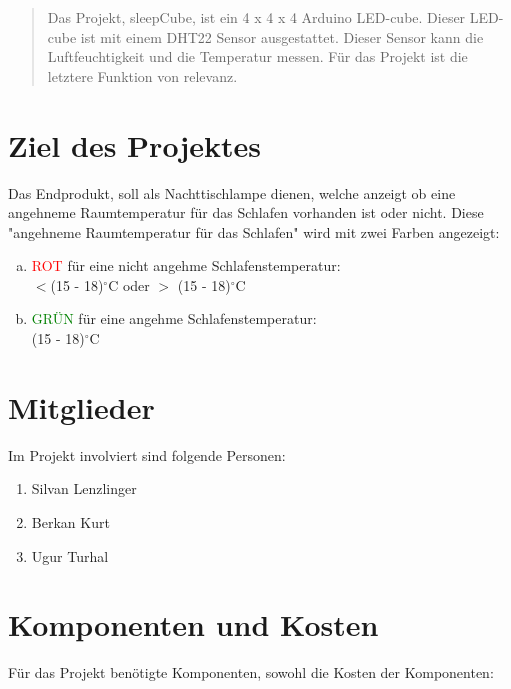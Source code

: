 \documentclass{paper}
\begin{document}
\pagestyle{fancy}
\fancyhead[C]{}                       
\begin{abstract}
\noindent Das Projekt, sleepCube, ist ein 4 x 4 x 4 Arduino LED-cube. Dieser LED-cube ist mit einem DHT22 Sensor ausgestattet. Dieser Sensor kann die Luftfeuchtigkeit und die Temperatur messen. Für das Projekt ist die letztere Funktion von relevanz.
\end{abstract}

\section*{Ziel des Projektes} Das Endprodukt, soll als Nachttischlampe dienen, welche anzeigt ob eine angehneme Raumtemperatur für das Schlafen vorhanden ist oder nicht. Diese "angehneme Raumtemperatur für das Schlafen" wird mit zwei Farben angezeigt:\begin{enumerate}[(a)]
\item \textcolor{red}{ROT} für eine nicht angehme Schlafenstemperatur:\\ $<$(15 - 18)$^{\circ}$C oder $>$ (15 - 18)$^{\circ}$C  
\item \textcolor{green}{GRÜN} für eine angehme Schlafenstemperatur:\\ (15 - 18)$^{\circ}$C 
\end{enumerate}
\section*{Mitglieder}
Im Projekt involviert sind folgende Personen: 
\begin{enumerate}[(1)]
\item Silvan Lenzlinger
\item Berkan Kurt 
\item Ugur Turhal
\end{enumerate}
\section*{Komponenten und Kosten}
Für das Projekt benötigte Komponenten, sowohl die Kosten der Komponenten:
\end{document}
